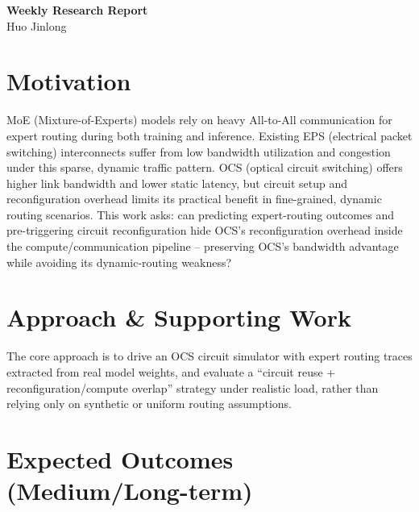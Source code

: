 \documentclass[11pt]{article}
\begin{document}
\begin{center}
{\Large\bfseries Weekly Research Report}\\[0.5em]
{\large Huo Jinlong}\\[0.2em]
\end{center}
\vspace{1.5em}


\section{Motivation}

MoE (Mixture-of-Experts) models rely on heavy All-to-All communication
for expert routing during both training and inference. Existing EPS
(electrical packet switching) interconnects suffer from low bandwidth
utilization and congestion under this sparse, dynamic traffic pattern.
OCS (optical circuit switching) offers higher link bandwidth and lower
static latency, but circuit setup and reconfiguration overhead limits
its practical benefit in fine-grained, dynamic routing scenarios. This
work asks: can predicting expert-routing outcomes and pre-triggering
circuit reconfiguration hide OCS's reconfiguration overhead inside the
compute/communication pipeline -- preserving OCS's bandwidth advantage
while avoiding its dynamic-routing weakness?

\section{Approach \& Supporting Work}

The core approach is to drive an OCS circuit simulator with expert
routing traces extracted from real model weights, and evaluate a
``circuit reuse + reconfiguration/compute overlap'' strategy under
realistic load, rather than relying only on synthetic or uniform
routing assumptions.

\section{Expected Outcomes (Medium/Long-term)}
\end{document}
